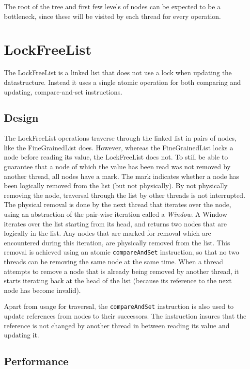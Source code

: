 \documentclass[a4paper]{article}
\begin{document}
The root of the tree and first few levels of nodes can be expected to be a
bottleneck, since these will be visited by each thread for every operation.

\section{LockFreeList}

The LockFreeList is a linked list that does not use a lock when updating
the datastructure. Instead it uses a single atomic operation for both
comparing and updating, compare-and-set instructions.

\subsection{Design}

The LockFreeList operations traverse through the linked list in pairs of nodes, like
the FineGrainedList does. However, whereas the FineGrainedList locks a node before
reading its value, the LockFreeList does not. To still be able to guarantee that a
node of which the value has been read was not removed by another thread, all nodes
have a mark. The mark indicates whether a node has been logically removed from the
list (but not physically). By not physically removing the node, traversal through the
list by other threads is not interrupted. The physical removal is done by the next
thread that iterates over the node, using an abstraction of the pair-wise iteration
called a \emph{Window}. A Window iterates over the list starting from its head, and
returns two nodes that are logically in the list. Any nodes that are marked for removal
which are encountered during this iteration, are physically removed from the list. This
removal is achieved using an atomic \texttt{compareAndSet} instruction, so that no two
threads can be removing the same node at the same time. When a thread attempts to
remove a node that is already being removed by another thread, it starts iterating back
at the head of the list (because its reference to the next node has become invalid).

Apart from usage for traversal, the \texttt{compareAndSet} instruction is also used
to update references from nodes to their successors. The instruction insures that the
reference is not changed by another thread in between reading its value and updating
it.

\subsection{Performance}
\end{document}
